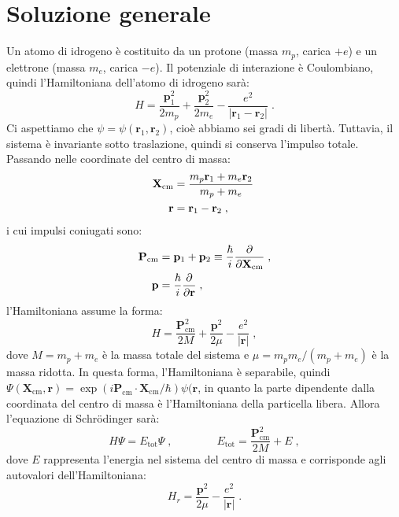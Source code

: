 \documentclass[10pt,a4paper]{report}
\theoremstyle{definition}
\numberwithin{equation}{section}
\newcommand{\Sch}{Schrödinger}
\begin{document}
\section{Soluzione generale}
Un atomo di idrogeno è costituito da un protone (massa $m_p$, carica $+e$) e un elettrone (massa $m_e$, carica $-e$). Il potenziale di interazione è Coulombiano, quindi l'Hamiltoniana dell'atomo di idrogeno sarà:
\begin{equation}
H=\frac{\mathbf{p}_1^2}{2m_p}+\frac{\mathbf{p}_2^2}{2m_e}-\frac{e^2}{|\mathbf{r}_1-\mathbf{r}_2|}\;.
\end{equation}
Ci aspettiamo che $\psi=\psi(\mathbf{r}_1,\mathbf{r}_2)$, cioè abbiamo sei gradi di libertà. Tuttavia, il sistema è invariante sotto traslazione, quindi si conserva l'impulso totale. Passando nelle coordinate del centro di massa:
\begin{align}
\mathbf{X}_{\mathrm{cm}}&=\frac{m_p\mathbf{r}_1+m_e\mathbf{r}_2}{m_p+m_e}\; \notag \\
\mathbf{r}&=\mathbf{r}_1-\mathbf{r}_2\;,
\end{align}
i cui impulsi coniugati sono:
\begin{align}
\mathbf{P}_{\mathrm{cm}}&=\mathbf{p}_1+\mathbf{p}_2\equiv\frac{\hbar}{i}\frac{\partial}{\partial\mathbf{X}_{\mathrm{cm}}}\;, \notag \\
\mathbf{p} &=\frac{\hbar}{i}\frac{\partial}{\partial\mathbf{r}}\;,
\end{align}
l'Hamiltoniana assume la forma:
\begin{equation}
H=\frac{\mathbf{P}_{\mathrm{cm}}^2}{2M}+\frac{\mathbf{p}^2}{2\mu}-\frac{e^2}{|\mathbf{r}|}\;,
\end{equation}
dove $M=m_p+m_e$ è la massa totale del sistema e $\mu=m_pm_e/(m_p+m_e)$ è la massa ridotta. In questa forma, l'Hamiltoniana è separabile, quindi $\Psi(\mathbf{X}_{\mathrm{cm}},\mathbf{r})=\exp(i\mathbf{P}_{\mathrm{cm}}\cdot\mathbf{X}_{\mathrm{cm}}/\hbar)\psi(\mathbf{r}$, in quanto la parte dipendente dalla coordinata del centro di massa è l'Hamiltoniana della particella libera. Allora l'equazione di \Sch\; sarà:
\begin{equation}
H\Psi=E_{\mathrm{tot}}\Psi\;, \qquad \qquad E_{\mathrm{tot}}=\frac{\mathbf{P}_{\mathrm{cm}}^2}{2M}+E\;,
\end{equation}
dove $E$ rappresenta l'energia nel sistema del centro di massa e corrisponde agli autovalori dell'Hamiltoniana:
\begin{equation}
H_r=\frac{\mathbf{p}^2}{2\mu}-\frac{e^2}{|\mathbf{r}|}\;.
\end{equation}
\end{document}
